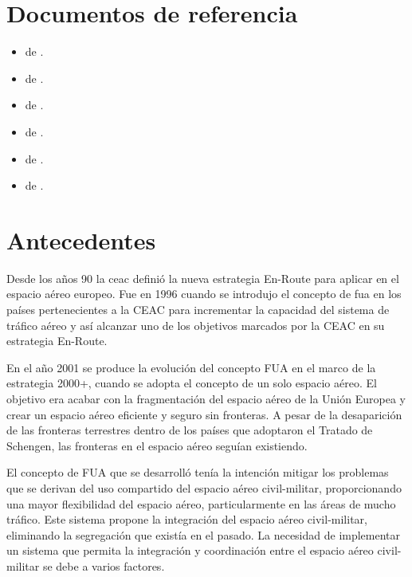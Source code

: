\section{Documentos de referencia}

\begin{itemize}
    \item \textbf{} de \citeauthor{Eurocontrol2015AdvancedConcept}  \cite{Eurocontrol2015AdvancedConcept}.
    \item \textbf{} de \citeauthor{Eurocontrol2021EuropeanManagement}  \cite{Eurocontrol2021EuropeanManagement}.
    \item \textbf{} de \citeauthor{Eurocontrol2021FUA15.0}  \cite{Eurocontrol2021FUA15.0}.
    \item \textbf{} de \citeauthor{Eurocontrol2009SpecificationFUA}  \cite{Eurocontrol2009SpecificationFUA}.
    \item \textbf{} de \citeauthor{OACI2018Manual9971}  \cite{OACI2018Manual9971}.
    \item \textbf{} de \citeauthor{OACI2021Manual10088}  \cite{OACI2021Manual10088}.
\end{itemize}

\section{Antecedentes}

Desde los años 90 la \acrfull{ceac} definió la nueva estrategia En-Route para aplicar en el espacio aéreo europeo. Fue en 1996 cuando se introdujo el concepto de \acrfull{fua} en los países pertenecientes a la CEAC para incrementar la capacidad del sistema de tráfico aéreo y así alcanzar uno de los objetivos marcados por la CEAC en su estrategia En-Route. 
 
En el año 2001 se produce la evolución del concepto FUA en el marco de la estrategia 2000+, cuando se adopta el concepto de un solo espacio aéreo.  El objetivo era acabar con la fragmentación del espacio aéreo de la Unión Europea y crear un espacio aéreo eficiente y seguro sin fronteras. A pesar de la desaparición de las fronteras terrestres dentro de los países que adoptaron el Tratado de Schengen, las fronteras en el espacio aéreo seguían existiendo. 
 
El concepto de FUA que se desarrolló tenía la intención mitigar los problemas que se derivan del uso compartido del espacio aéreo civil-militar, proporcionando una mayor flexibilidad del   espacio aéreo, particularmente en las áreas de mucho tráfico. Este sistema propone la integración del espacio aéreo civil-militar, eliminando la segregación que existía en el pasado. 
La necesidad de implementar un sistema que permita la integración y coordinación entre el espacio aéreo civil-militar se debe a varios factores.

